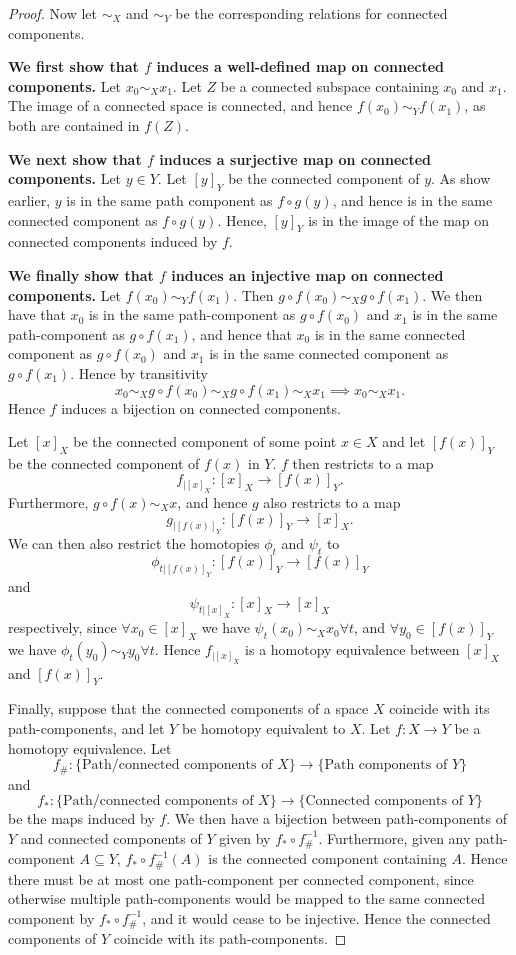 \documentclass{article}
\begin{document}
\begin{proof}
Now let $\sim_X$ and $\sim_Y$ be the corresponding relations for connected components.

\textbf{We first show that $f$ induces a well-defined map on connected components.}
Let $x_0\sim_X x_1$. Let $Z$ be a connected subspace containing $x_0$ and $x_1$. The image of a connected space is connected, and hence $f(x_0)\sim_Y f(x_1)$, as both are contained in $f(Z)$.

\textbf{We next show that $f$ induces a surjective map on connected components.}
Let $y\in Y$. Let $[y]_Y$ be the connected component of $y$. As show earlier, $y$ is in the same path component as $f\circ g(y)$, and hence is in the same connected component as $f\circ g(y)$. Hence, $[y]_Y$ is in the image of the map on connected components induced by $f$.

\textbf{We finally show that $f$ induces an injective map on connected components.}
Let $f(x_0)\sim_Yf(x_1)$. Then $g\circ f(x_0)\sim_X g\circ f(x_1)$. We then have that $x_0$ is in the same path-component as $g\circ f(x_0)$ and $x_1$ is in the same path-component as $g\circ f(x_1)$, and hence that $x_0$ is in the same connected component as $g\circ f(x_0)$ and $x_1$ is in the same connected component as $g\circ f(x_1)$. Hence by transitivity\[x_0\sim_X g\circ f(x_0)\sim_Xg\circ f(x_1)\sim_X x_1\implies x_0\sim_X x_1.\] Hence $f$ induces a bijection on connected components.

Let $[x]_X$ be the connected component of some point $x\in X$ and let $[f(x)]_Y$ be the connected component of $f(x)$ in $Y$. $f$ then restricts to a map\[f_{|[x]_X}:[x]_X\to [f(x)]_Y.\]Furthermore, $g\circ f(x)\sim_X x$, and hence $g$ also restricts to a map \[g_{|[f(x)]_Y}:[f(x)]_Y\to[x]_X.\]We can then also restrict the homotopies $\phi_t$ and $\psi_t$ to \[\phi_{t|[f(x)]_Y}:[f(x)]_Y\to[f(x)]_Y\] and \[\psi_{t|[x]_X}:[x]_X\to[x]_X\] respectively, since $\forall x_0\in[x]_X$ we have $\psi_t(x_0)\sim_Xx_0\forall t$, and $\forall y_0\in[f(x)]_Y$ we have $\phi_t(y_0)\sim_Y y_0\forall t$. Hence $f_{|[x]_X}$ is a homotopy equivalence between $[x]_X$ and $[f(x)]_Y$.

Finally, suppose that the connected components of a space $X$ coincide with its path-components, and let $Y$ be homotopy equivalent to $X$. Let $f:X\to Y$ be a homotopy equivalence. Let \[f_\#:\{\text{Path/connected components of } X\}\to\{\text{Path components of } Y\}\] and \[f_*:\{\text{Path/connected components of } X\}\to\{\text{Connected components of } Y\}\] be the maps induced by $f$. We then have a bijection between path-components of $Y$ and connected components of $Y$ given by $f_*\circ f_\#^{-1}$. Furthermore, given any path-component $A\subseteq Y$, $f_*\circ f_\#^{-1}(A)$ is the connected component containing $A$. Hence there must be at most one path-component per connected component, since otherwise multiple path-components would be mapped to the same connected component by $f_*\circ f_\#^{-1}$, and it would cease to be injective. Hence the connected components of $Y$ coincide with its path-components.
\end{proof}
\end{document}
